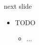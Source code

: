 \begin{Slide}{next slide}
\begin{itemize}
\item TODO
\begin{itemize}
\item ...
\end{itemize}
\end{itemize}
\end{Slide}